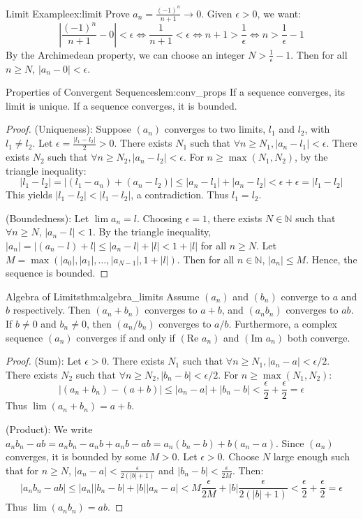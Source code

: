 \documentclass[11pt, a4paper]{article}
\begin{document}
\begin{example}{Limit Example}{ex:limit}
Prove $a_n = \frac{(-1)^n}{n+1} \to 0$. Given $\epsilon > 0$, we want:
$$ \left| \frac{(-1)^n}{n+1} - 0 \right| < \epsilon \iff \frac{1}{n+1} < \epsilon \iff n+1 > \frac{1}{\epsilon} \iff n > \frac{1}{\epsilon} - 1 $$
By the Archimedean property, we can choose an integer $N > \frac{1}{\epsilon} - 1$. Then for all $n \ge N$, $|a_n - 0| < \epsilon$.
\end{example}

\begin{lemma}{Properties of Convergent Sequences}{lem:conv_props}
If a sequence converges, its limit is unique. If a sequence converges, it is bounded.
\end{lemma}
\begin{proof}
(Uniqueness): Suppose $(a_n)$ converges to two limits, $l_1$ and $l_2$, with $l_1 \neq l_2$.
Let $\epsilon = \frac{|l_1 - l_2|}{2} > 0$.
There exists $N_1$ such that $\forall n \ge N_1, |a_n - l_1| < \epsilon$.
There exists $N_2$ such that $\forall n \ge N_2, |a_n - l_2| < \epsilon$.
For $n \ge \max(N_1, N_2)$, by the triangle inequality:
$$ |l_1 - l_2| = |(l_1 - a_n) + (a_n - l_2)| \le |a_n - l_1| + |a_n - l_2| < \epsilon + \epsilon = |l_1 - l_2| $$
This yields $|l_1 - l_2| < |l_1 - l_2|$, a contradiction. Thus $l_1 = l_2$.

(Boundedness): Let $\lim a_n = l$. Choosing $\epsilon = 1$, there exists $N \in \mathbb{N}$ such that $\forall n \ge N$, $|a_n - l| < 1$.
By the triangle inequality, $|a_n| = |(a_n - l) + l| \le |a_n - l| + |l| < 1 + |l|$ for all $n \ge N$.
Let $M = \max(|a_0|, |a_1|, \dots, |a_{N-1}|, 1 + |l|)$. Then for all $n \in \mathbb{N}$, $|a_n| \le M$. Hence, the sequence is bounded.
\end{proof}

\begin{theorem}{Algebra of Limits}{thm:algebra_limits}
Assume $(a_n)$ and $(b_n)$ converge to $a$ and $b$ respectively. Then $(a_n + b_n)$ converges to $a + b$, and $(a_n b_n)$ converges to $ab$. If $b \neq 0$ and $b_n \neq 0$, then $(a_n / b_n)$ converges to $a/b$.
Furthermore, a complex sequence $(a_n)$ converges if and only if $(\text{Re } a_n)$ and $(\text{Im } a_n)$ both converge.
\end{theorem}
\begin{proof}
(Sum): Let $\epsilon > 0$. There exists $N_1$ such that $\forall n \ge N_1, |a_n - a| < \epsilon/2$. There exists $N_2$ such that $\forall n \ge N_2, |b_n - b| < \epsilon/2$. For $n \ge \max(N_1, N_2)$:
$$ |(a_n + b_n) - (a + b)| \le |a_n - a| + |b_n - b| < \frac{\epsilon}{2} + \frac{\epsilon}{2} = \epsilon $$
Thus $\lim (a_n + b_n) = a + b$.

(Product): We write $a_n b_n - ab = a_n b_n - a_n b + a_n b - ab = a_n(b_n - b) + b(a_n - a)$.
Since $(a_n)$ converges, it is bounded by some $M > 0$. Let $\epsilon > 0$.
Choose $N$ large enough such that for $n \ge N$, $|a_n - a| < \frac{\epsilon}{2(|b|+1)}$ and $|b_n - b| < \frac{\epsilon}{2M}$.
Then:
$$ |a_n b_n - ab| \le |a_n||b_n - b| + |b||a_n - a| < M \frac{\epsilon}{2M} + |b| \frac{\epsilon}{2(|b|+1)} < \frac{\epsilon}{2} + \frac{\epsilon}{2} = \epsilon $$
Thus $\lim (a_n b_n) = ab$.
\end{proof}
\end{document}
